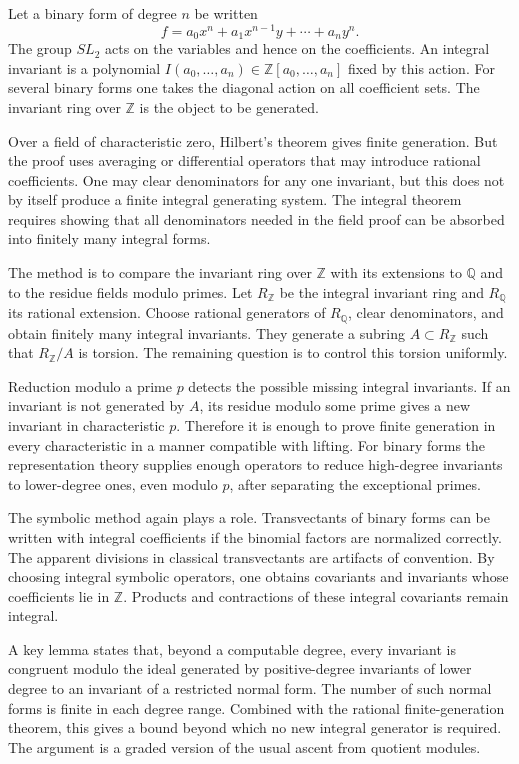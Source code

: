 \documentclass[12pt]{article}
\begin{document}
Let a binary form of degree \(n\) be written \[   f=a_0x^n+a_1x^{n-1}y+\cdots+a_ny^n. \] The group
\(SL_2\) acts on the variables and hence on the coefficients. An integral invariant is a polynomial
\(I(a_0, \ldots,a_n)\in\mathbb Z[a_0, \ldots,a_n]\) fixed by this action. For several binary forms
one takes the diagonal action on all coefficient sets. The invariant ring over \(\mathbb Z\) is the
object to be generated.


Over a field of characteristic zero, Hilbert's theorem gives finite generation. But the proof uses
averaging or differential operators that may introduce rational coefficients. One may clear
denominators for any one invariant, but this does not by itself produce a finite integral generating
system. The integral theorem requires showing that all denominators needed in the field proof can be
absorbed into finitely many integral forms.


The method is to compare the invariant ring over \(\mathbb Z\) with its extensions to \(\mathbb Q\)
and to the residue fields modulo primes. Let \(R_\mathbb Z\) be the integral invariant ring and
\(R_\mathbb Q\) its rational extension. Choose rational generators of \(R_\mathbb Q\), clear
denominators, and obtain finitely many integral invariants. They generate a subring \(A\subset
R_\mathbb Z\) such that \(R_\mathbb Z/A\) is torsion. The remaining question is to control this
torsion uniformly.


Reduction modulo a prime \(p\) detects the possible missing integral invariants. If an invariant is
not generated by \(A\), its residue modulo some prime gives a new invariant in characteristic \(p\).
Therefore it is enough to prove finite generation in every characteristic in a manner compatible
with lifting. For binary forms the representation theory supplies enough operators to reduce
high-degree invariants to lower-degree ones, even modulo \(p\), after separating the exceptional
primes.


The symbolic method again plays a role. Transvectants of binary forms can be written with integral
coefficients if the binomial factors are normalized correctly. The apparent divisions in classical
transvectants are artifacts of convention. By choosing integral symbolic operators, one obtains
covariants and invariants whose coefficients lie in \(\mathbb Z\). Products and contractions of
these integral covariants remain integral.


A key lemma states that, beyond a computable degree, every invariant is congruent modulo the ideal
generated by positive-degree invariants of lower degree to an invariant of a restricted normal form.
The number of such normal forms is finite in each degree range. Combined with the rational
finite-generation theorem, this gives a bound beyond which no new integral generator is required.
The argument is a graded version of the usual ascent from quotient modules.
\end{document}
